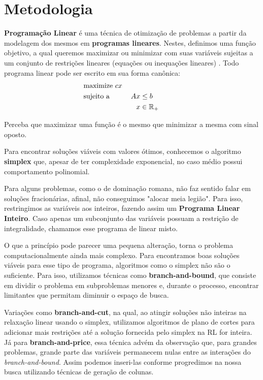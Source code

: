 \documentclass[11pt]{article}
\begin{document}
{\section{Metodologia}
\label{sec:orga19f19c}

\textbf{Programação Linear} é uma técnica de otimização de problemas a partir da modelagem dos mesmos em \textbf{programas lineares}.
Nestes, definimos uma função objetivo, a qual queremos maximizar ou minimizar com suas variáveis sujeitas a um conjunto de restrições lineares (equações ou inequações lineares) \autocite{Chvatal1983LinearProgramming} . Todo programa linear pode ser escrito em sua forma canônica:
\begin{alignat*}{4}
& \omit\rlap{maximize  $\displaystyle cx$} \\
& \mbox{sujeito a}&& \quad & Ax & \leq b  & \quad &  \\
&                 &&       & x               & \in \mathbb{R}_+ &      &
\end{alignat*}

Perceba que maximizar uma função é o mesmo que minimizar a mesma com sinal oposto.

Para encontrar soluções viáveis com valores ótimos, conhecemos o algoritmo \textbf{simplex} que, apesar de ter complexidade exponencial, no caso médio possui comportamento polinomial.

Para alguns problemas, como o de dominação romana, não faz sentido falar em soluções fracionárias, afinal, não conseguimos "alocar meia legião".
Para isso, restringimos as variáveis aos inteiros, fazendo assim um \textbf{Programa Linear Inteiro}. Caso apenas um subconjunto das variáveis possuam a restrição de integralidade, chamamos esse programa de linear misto.


O que a princípio pode parecer uma pequena alteração, torna o problema computacionalmente ainda mais complexo. Para encontramos boas soluções viáveis para esse tipo de programa, algoritmos como o simplex não são o suficiente. Para isso, utilizamos técnicas como \textbf{branch-and-bound}, que consiste em dividir o problema em subproblemas menores e, durante o processo, encontrar limitantes que permitam diminuir o espaço de busca.

Variações como \textbf{branch-and-cut}, na qual, ao atingir soluções não inteiras na relaxação linear usando o simplex, utilizamos algoritmos de plano de cortes para adicionar mais restrições até a solução fornecida pelo simplex na RL for inteira.
Já para \textbf{branch-and-price}, essa técnica advém da observação que, para grandes problemas, grande parte das variáveis permanecem nulas entre as interações do \emph{branch-and-bound}.
Assim podemos inseri-las conforme progredimos na nossa busca utilizando técnicas de geração de colunas.

}
\end{document}
